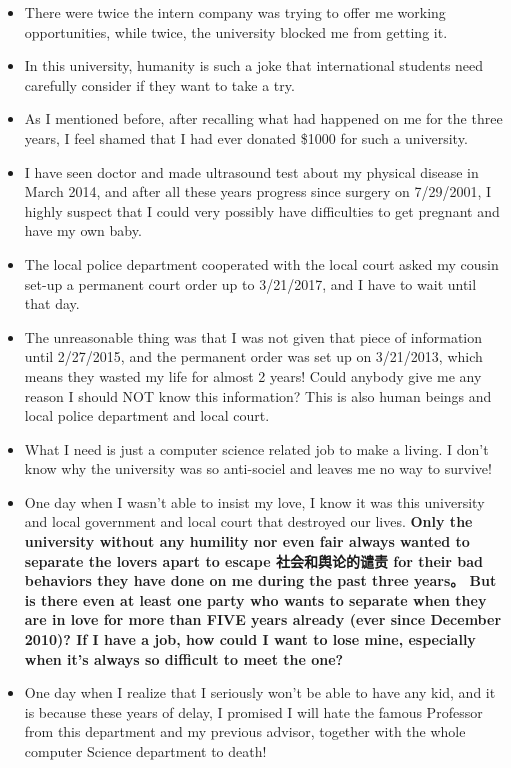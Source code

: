 \documentclass[9pt,b5paper]{article}
\begin{document}
\begin{itemize}
\item There were twice the intern company was trying to offer me working opportunities, while twice, the university blocked me from getting it.
\item In this university, humanity is such a joke that international students need carefully consider if they want to take a try.
\item As I mentioned before, after recalling what had happened on me for the three years, I feel shamed that I had ever donated \$1000 for such a university.
\item I have seen doctor and made ultrasound test about my physical disease in March 2014, and after all these years progress since surgery on 7/29/2001, I highly suspect that I could very possibly have difficulties to get pregnant and have my own baby.
\item The local police department cooperated with the local court asked my cousin set-up a permanent court order up to 3/21/2017, and I have to wait until that day.
\item The unreasonable thing was that I was not given that piece of information until 2/27/2015, and the permanent order was set up on 3/21/2013, which means they wasted my life for almost 2 years! Could anybody give me any reason I should NOT know this information? This is also human beings and local police department and local court.
\item What I need is just a computer science related job to make a living. I don't know why the university was so anti-sociel and leaves me no way to survive!
\item One day when I wasn't able to insist my love, I know it was this university and local government and local court that destroyed our lives. \textbf{Only the university without any humility nor even fair always wanted to separate the lovers apart to escape 社会和舆论的谴责 for their bad behaviors they have done on me during the past three years。 But is there even at least one party who wants to separate when they are in love for more than FIVE years already (ever since December 2010)? If I have a job, how could I want to lose mine, especially when it's always so difficult to meet the one?}

\item One day when I realize that I seriously won't be able to have any kid, and it is because these years of delay, I promised I will hate the famous Professor from this department and my previous advisor, together with the whole computer Science department to death!
\end{itemize}
\end{document}
